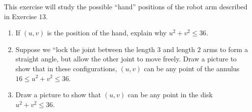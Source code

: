 \begin{exercise}{14}
This exercise will study the possible ``hand'' positions of the robot arm described in Exercise $13$.
\begin{enumerate}
    \item If $(u,v)$ is the position of the hand, explain why $u^2 + v^2 \leq 36$.
    \item Suppose we ``lock the joint between the length $3$ and length $2$ arms to form a straight angle, but allow the other joint to move freely. 
    Draw a picture to show that in these configurations, $(u,v)$ can be any point of the annulus $16\leq u^2 + v^2 \leq 36$.
    \item Draw a picture to show that $(u,v)$ can be any point in the disk $u^2 + v^2\leq 36$.
\end{enumerate}
\end{exercise}
